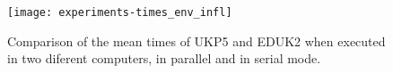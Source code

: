 

\begin{figure}[h]
\caption{Comparison of the mean times of UKP5 and EDUK2 when executed in two diferent computers, in parallel and in serial mode.}
\begin{center}
\texttt{[image: experiments-times\_env\_infl]}
\end{center}
\label{fig:mean_time_env_infl}
\end{figure}



